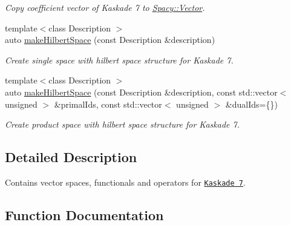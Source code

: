 \begin{DoxyCompactItemize}
\begin{DoxyCompactList}\small\item\em Copy coefficient vector of Kaskade 7 to \hyperlink{classSpacy_1_1Vector}{Spacy\+::\+Vector}. \end{DoxyCompactList}\item 
{\footnotesize template$<$class Description $>$ }\\auto \hyperlink{group__VectorSpaceGroup_ga04d45446864bbf87770d02eade7b64cf}{make\+Hilbert\+Space} (const Description \&description)
\begin{DoxyCompactList}\small\item\em Create single space with hilbert space structure for Kaskade 7. \end{DoxyCompactList}\item 
{\footnotesize template$<$class Description $>$ }\\auto \hyperlink{group__VectorSpaceGroup_ga221db25c41371a2a823a6b569d735ef6}{make\+Hilbert\+Space} (const Description \&description, const std\+::vector$<$ unsigned $>$ \&primal\+Ids, const std\+::vector$<$ unsigned $>$ \&dual\+Ids=\{\})
\begin{DoxyCompactList}\small\item\em Create product space with hilbert space structure for Kaskade 7. \end{DoxyCompactList}\end{DoxyCompactItemize}


\subsection{Detailed Description}
Contains vector spaces, functionals and operators for \href{http://www.zib.de/projects/kaskade7-finite-element-toolbox}{\tt Kaskade 7}. 

\subsection{Function Documentation}
\hypertarget{namespaceSpacy_1_1Kaskade_a6d002a1f8aefa3369e0aae6250296665}{}
